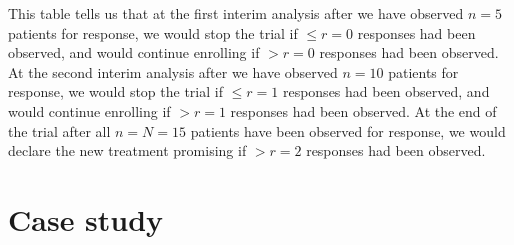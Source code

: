 This table tells us that at the first interim analysis after we have observed \(n=5\) patients for response, we would stop the trial if \(\leq r=0\) responses had been observed, and would continue enrolling if \(> r=0\) responses had been observed. At the second interim analysis after we have observed \(n=10\) patients for response, we would stop the trial if \(\leq r=1\) responses had been observed, and would continue enrolling if \(> r=1\) responses had been observed. At the end of the trial after all \(n=N=15\) patients have been observed for response, we would declare the new treatment promising if \(> r=2\) responses had been observed.

\hypertarget{case-study}{%
\section{Case study}\label{case-study}}

